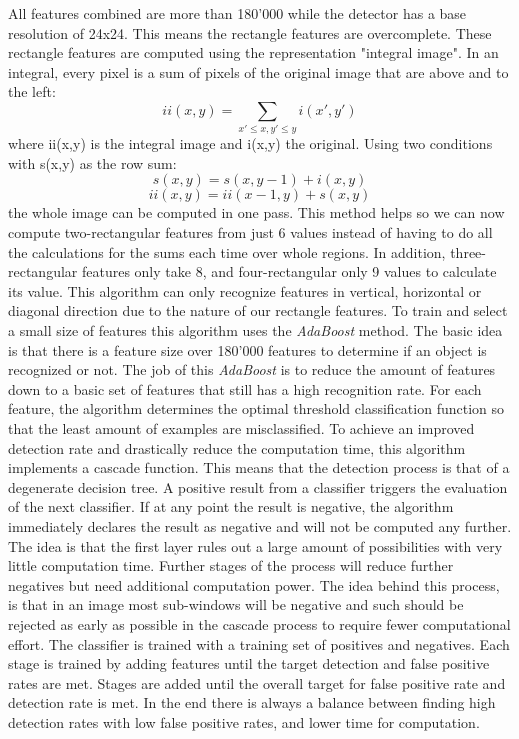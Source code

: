 All features combined are more than 180'000 while the detector has a base resolution of 24x24. This means the rectangle features are overcomplete.
These rectangle features are computed using the representation "integral image". In an integral, every pixel is a sum of pixels of the original image that are above and to the left:
\begin{equation}ii(x,y) = \sum_{x'\leq x, y'\leq y} i(x',y')\end{equation}
where ii(x,y) is the integral image and i(x,y) the original. Using two conditions with s(x,y) as the row sum:
\begin{equation}s(x,y) = s(x,y-1)+i(x,y)\end{equation}
\begin{equation}ii(x,y) = ii(x-1,y)+s(x,y)\end{equation}
the whole image can be computed in one pass.
This method helps so we can now compute two-rectangular features from just 6 values instead of having to do all the calculations for the sums each time over whole regions. In addition, three-rectangular features only take 8, and four-rectangular only 9 values to calculate its value. This algorithm can only recognize features in vertical, horizontal or diagonal direction due to the nature of our rectangle features.
To train and select a small size of features this algorithm uses the \textit{AdaBoost} method. The basic idea is that there is a feature size over 180'000 features to determine if an object is recognized or not. The job of this \textit{AdaBoost} is to reduce the amount of features down to a basic set of features that still has a high recognition rate. For each feature, the algorithm determines the optimal threshold classification function so that the least amount of examples are misclassified.
To achieve an improved detection rate and drastically reduce the computation time, this algorithm implements a cascade function. This means that the detection process is that of a degenerate decision tree. A positive result from a classifier triggers the evaluation of the next classifier. If at any point the result is negative, the algorithm immediately declares the result as negative and will not be computed any further. The idea is that the first layer rules out a large amount of possibilities with very little computation time. Further stages of the process will reduce further negatives but need additional computation power. The idea behind this process, is that in an image most sub-windows will be negative and such should be rejected as early as possible in the cascade process to require fewer computational effort.
The classifier is trained with a training set of positives and negatives. Each stage is trained by adding features until the target detection and false positive rates are met. Stages are added until the overall target for false positive rate and detection rate is met. In the end there is always a balance between finding high detection rates with low false positive rates, and lower time for computation.

